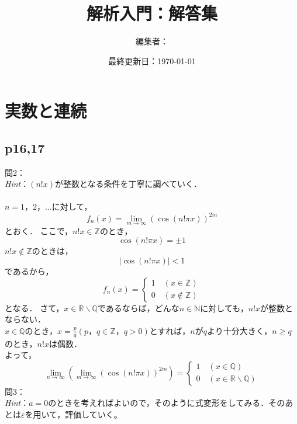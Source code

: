 \documentclass[dvipdfmx,uplatex,11pt]{jsarticle}
\title{解析入門：解答集}
\author{編集者：}
\date{最終更新日：\today}
\begin{document}
\maketitle
\tableofcontents
\newpage
%
\section{実数と連続}
%
\subsection{p16,17}
%
\noindent
問2：
\\
\textsl{Hint}：$(n!x)$が整数となる条件を丁寧に調べていく．\\
\dotfill
%
% 
%
\\
$n=1，2，\ldots$に対して，
\[
	f_{n} (x)=\lim_{m \to \infty} (\cos (n! \pi x)) ^{2m}
\]
とおく．
ここで，$n!x \in \mathbb{Z}$のとき，
\[
	\cos (n! \pi x)=\pm 1
\]
$n!x \notin \mathbb{Z}$のときは，
\[
	|\cos (n! \pi x)|<1
\]
であるから，
\[
	f_{n} (x)=
	\begin{cases}
		1 \quad(x \in \mathbb{Z}) \\
		0 \quad (x \notin \mathbb{Z})
	\end{cases}
\]
となる．
さて，$x \in \mathbb{R} \backslash\mathbb{Q}$であるならば，どんな$n \in \mathbb{N}$に対しても，$n! x$が整数とならない．\\
$x \in \mathbb{Q}$のとき，$ x=\frac{p}{q}(p，q \in \mathbb{Z}，q>0)$とすれば，$n$が$q$より十分大きく，$n \ge q$のとき，$n!x$は偶数．\\
よって，
\[
	\lim_{n \to \infty} \left( \lim_{m \to \infty} (\cos (n! \pi x)) ^{2m} \right)=
	\begin{cases}
		1 \quad (x \in \mathbb{Q}) \\
		0  \quad (x \in \mathbb{R} \backslash \mathbb{Q})
	\end{cases}
\]
%
\newpage
%
\noindent
問3：
\\
\textsl{Hint}：$a=0$のときを考えればよいので，そのように式変形をしてみる．そのあとは$\varepsilon$を用いて，評価していく。\\
\dotfill
%
\end{document}
